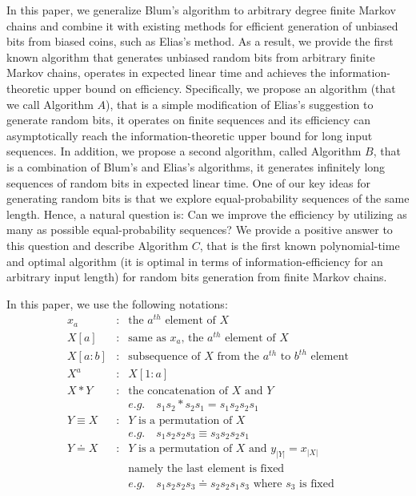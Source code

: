 \documentclass[journal]{IEEEtran}
\def\tmu{\doteq}
\def\pmu{\equiv}
\begin{document}
In this paper, we generalize Blum's algorithm to arbitrary degree finite Markov chains and combine it with existing methods for efficient generation of unbiased bits from biased coins, such as Elias's method.  As a result, we provide the first known algorithm that generates unbiased random bits from arbitrary finite Markov chains, operates in expected linear time and achieves the information-theoretic upper bound on efficiency.  Specifically, we propose an algorithm (that we call Algorithm $A$), that is a simple modification of Elias's suggestion to generate random bits, it operates on finite sequences and its efficiency can asymptotically reach the information-theoretic upper bound for long input sequences. In addition, we propose a second algorithm, called Algorithm $B$, that is a combination of Blum's and Elias's algorithms, it generates infinitely long sequences of random bits in expected linear time. One of our key ideas for generating random bits is that we explore equal-probability sequences of the same length. Hence,
a natural question is: Can we improve the efficiency by utilizing as many as possible equal-probability sequences? We provide a positive answer
to this question and describe Algorithm $C$, that is the first known polynomial-time and optimal algorithm (it is optimal in terms of information-efficiency for an arbitrary input length) for random bits generation from finite Markov chains.

In this paper, we use the following notations:
$$\begin{array}{lcl}
x_a & : & \textrm{the $a^{th}$ element of $X$}\\
X[a] & : & \textrm{same as $x_a$, the $a^{th}$ element of $X$}\\
X[a:b] &: & \textrm{subsequence of $X$ from the $a^{th}$ to $b^{th}$ element}\\
X^a & : &  X[1:a]\\
X*Y &:& \textrm{the concatenation of $X$ and $Y$}\\
& & e.g. \quad s_1s_2*s_2s_1=s_1s_2s_2s_1\\
Y \pmu X &:& Y \textrm{ is a permutation of } X \\
& & e.g. \quad s_1s_2s_2s_3\pmu s_3s_2s_2s_1\\
Y \tmu X &:& Y \textrm{ is a permutation of } X \textrm{ and } y_{|Y|}=x_{|X|}\\
& & \textrm{namely the last element is fixed}\\
& & e.g. \quad s_1s_2s_2s_3\tmu s_2s_2s_1s_3 \textrm{ where } s_3 \textrm{ is fixed}\\
\end{array}
$$
\end{document}
